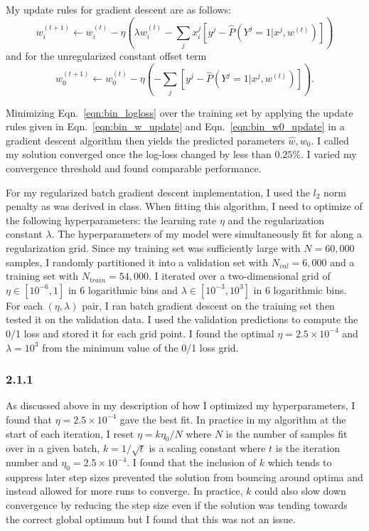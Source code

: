 \documentclass[12pt]{amsart}
\begin{document}
My update rules for gradient descent are as follows:
\begin{equation} \label{eqn:bin_w_update}
w^{(t+1)}_i \leftarrow w^{(t)}_i - \eta (\lambda w^{(t)}_i - \sum_j x^j_i[y^j - \hat{P}(Y^j = 1 | x^j, w^{(t)})])
\end{equation}
and for the unregularized constant offset term
\begin{equation} \label{eqn:bin_w0_update}
w^{(t+1)}_0 \leftarrow w^{(t)}_0 - \eta (- \sum_j[y^j - \hat{P}(Y^j = 1 | x^j, w^{(t)})]).
\end{equation}

Minimizing Eqn.~\ref{eqn:bin_logloss} over the training set by applying the update rules given in Eqn.~\ref{eqn:bin_w_update} and Eqn.~\ref{eqn:bin_w0_update} in a gradient descent algorithm then yields the predicted parameters $\hat{w}, w_0$.  I called my solution converged once the log-loss changed by less than $0.25 \%$.  I varied my convergence threshold and found comparable performance.

For my regularized batch gradient descent implementation, I used the $l_2$ norm penalty as was derived in class.  When fitting this algorithm, I need to optimize of the following hyperparameters: the learning rate $\eta$ and the regularization constant $\lambda$.  The hyperparameters of my model were simultaneously fit for along a regularization grid.  Since my training set was sufficiently large with $N = 60,000$ samples, I randomly partitioned it into a validation set with $N_{val} = 6,000$ and a training set with $N_{train} = 54,000$.  I iterated over a two-dimensional grid of $\eta \in [10^{-6},1]$ in 6 logarithmic bins and $\lambda \in [10^{-3},10^{3}]$ in 6 logarithmic bins.  For each $(\eta,\lambda)$ pair, I ran batch gradient descent on the training set then tested it on the validation data.  I used the validation predictions to compute the 0/1 loss and stored it for each grid point.  I found the optimal $\eta = 2.5 \times 10^{-4}$ and $\lambda = 10^3$ from the minimum value of the 0/1 loss grid.  

\subsubsection*{2.1.1}
As discussed above in my description of how I optimized my hyperparameters, I found that $\eta = 2.5 \times 10^{-4}$ gave the best fit.  In practice in my algorithm at the start of each iteration, I reset $\eta = k\eta_0/N$ where $N$ is the number of samples fit over in a given batch, $k = 1/\sqrt{t}$ is a scaling constant where $t$ is the iteration number and $\eta_0 = 2.5 \times 10^{-4}$.  I found that the inclusion of $k$ which tends to suppress later step sizes prevented the solution from bouncing around optima and instead allowed for more runs to converge.  In practice, $k$ could also slow down convergence by reducing the step size even if the solution was tending towards the correct global optimum but I found that this was not an issue.
\end{document}
